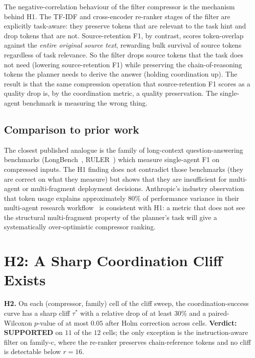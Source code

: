 The negative-correlation behaviour of the filter compressor is the
mechanism behind H1. The TF-IDF and cross-encoder re-ranker stages
of the filter are explicitly task-aware: they preserve tokens that
are relevant to the task hint and drop tokens that are not.
Source-retention F1, by contrast, scores token-overlap against the
\emph{entire original source text}, rewarding bulk survival of
source tokens regardless of task relevance. So the filter drops
source tokens that the task does not need (lowering source-retention
F1) while preserving the chain-of-reasoning tokens the
planner needs to derive the answer (holding coordination up). The
result is that the same compression operation that source-retention
F1 scores as a quality drop is, by the coordination metric, a
quality preservation. The single-agent benchmark is measuring the
wrong thing.

\subsection{Comparison to prior work}

The closest published analogue is the family of long-context
question-answering benchmarks (LongBench~\cite{bai2024longbench},
RULER~\cite{hsieh2024ruler}) which measure single-agent F1 on
compressed inputs. The H1 finding does not contradict those
benchmarks (they are correct on what they measure) but shows that
they are insufficient for multi-agent or multi-fragment deployment
decisions. Anthropic's industry observation that token
usage explains approximately $80\%$ of performance variance in
their multi-agent research workflow~\cite{anthropic2025multiagent}
is consistent with H1: a metric that does not see the structural
multi-fragment property of the planner's task will give a
systematically over-optimistic compressor ranking.

\section{H2: A Sharp Coordination Cliff Exists}
\label{sec:h2}

\begin{tcolorbox}[colback=black!4, colframe=black!50, sharp corners,
                  boxrule=0.4pt, boxsep=2pt, left=4pt, right=4pt,
                  top=2pt, bottom=2pt]
\textbf{H2.} On each (compressor, family) cell of the cliff sweep,
the coordination-success curve has a sharp cliff $\tau^{*}$ with a
relative drop of at least $30\%$ and a paired-Wilcoxon $p$-value of
at most $0.05$ after Holm correction across cells. \textbf{Verdict:
SUPPORTED} on $11$ of the $12$ cells; the only exception is the
instruction-aware filter on family-c, where the re-ranker
preserves chain-reference tokens and no cliff is detectable
below $r=16$.
\end{tcolorbox}

